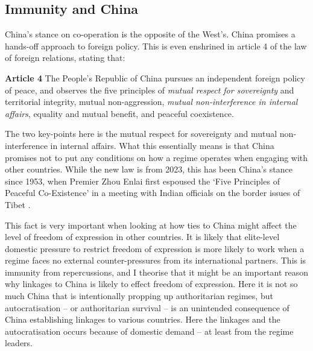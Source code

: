 \subsection{Immunity and China}
China's stance on co-operation is the opposite of the West's. China promises a hands-off approach to foreign policy. This is even enshrined in article 4 of the law of foreign relations, stating that:
\begin{displayquote}
\textbf{Article 4} The People's Republic of China pursues an independent foreign policy of peace, and observes the five principles of \textit{mutual respect for sovereignty} and territorial integrity, mutual non-aggression, \textit{mutual non-interference in internal affairs}, equality and mutual benefit, and peaceful coexistence. \citep[emphases are my own]{xinhua_law_2023}
\end{displayquote}
The two key-points here is the mutual respect for sovereignty and mutual non-interference in internal affairs. What this essentially means is that China promises not to put any conditions on how a regime operates when engaging with other countries. While the new law is from 2023, this has been China's stance since 1953, when Premier Zhou Enlai first espoused the `Five Principles of Peaceful Co-Existence' in a meeting with Indian officials on the border issues of Tibet \citep{zhonghua_renmin_gongheguo_jiaowenbu_ministry_of_foreign_affairs_of_the_peoples_republic_of_china_zhongguo_2000}.

This fact is very important when looking at how ties to China might affect the level of freedom of expression in other countries. It is likely that elite-level domestic pressure to restrict freedom of expression is more likely to work when a regime faces no external counter-pressures from its international partners. This is immunity from repercussions, and I theorise that it might be an important reason why linkages to China is likely to effect freedom of expression. Here it is not so much China that is intentionally propping up authoritarian regimes, but autocratisation -- or authoritarian survival -- is an unintended consequence of China establishing linkages to various countries. Here the linkages and the autocratisation occurs because of domestic demand -- at least from the regime leaders.

